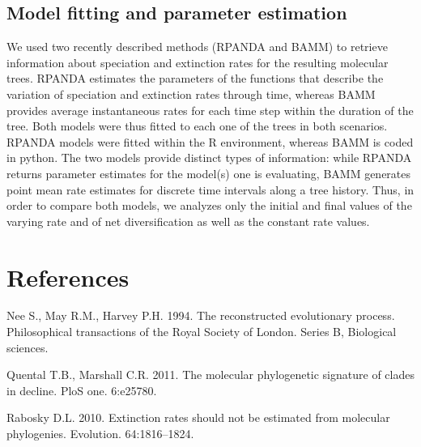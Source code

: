 \documentclass[11pt,]{article}
\begin{document}
\subsection{Model fitting and parameter
estimation}\label{model-fitting-and-parameter-estimation}

We used two recently described methods (RPANDA and BAMM) to retrieve
information about speciation and extinction rates for the resulting
molecular trees. RPANDA estimates the parameters of the functions that
describe the variation of speciation and extinction rates through time,
whereas BAMM provides average instantaneous rates for each time step
within the duration of the tree. Both models were thus fitted to each
one of the trees in both scenarios. RPANDA models were fitted within the
R environment, whereas BAMM is coded in python. The two models provide
distinct types of information: while RPANDA returns parameter estimates
for the model(s) one is evaluating, BAMM generates point mean rate
estimates for discrete time intervals along a tree history. Thus, in
order to compare both models, we analyzes only the initial and final
values of the varying rate and of net diversification as well as the
constant rate values.

\section*{References}\label{references}

Nee S., May R.M., Harvey P.H. 1994. The reconstructed evolutionary
process. Philosophical transactions of the Royal Society of London.
Series B, Biological sciences.

Quental T.B., Marshall C.R. 2011. The molecular phylogenetic signature
of clades in decline. PloS one. 6:e25780.

Rabosky D.L. 2010. Extinction rates should not be estimated from
molecular phylogenies. Evolution. 64:1816--1824.
\end{document}
